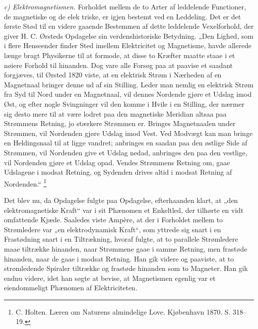 \documentclass[12pt,a4paper]{book}
\newcommand{\runin}[1]{\emph{#1}\hspace{0.4em}}
\begin{document}
\runin{c) Elektromagnetismen.} Forholdet mellem de to Arter af
leddelende Functioner, de magnetiske og de elek\-%
triske, er igjen bestemt ved en Leddeling. Det er det første Stød til
en videre gaaende Bestemmen af dette leddelende Vexelforhold, der
giver H. C. Ørsteds Opdagelse sin verdenshistoriske Betydning.
„Den Lighed, som i flere Henseender finder Sted imellem Elektricitet
og Magnetisme, havde allerede længe bragt Physikerne til at formode,
at disse to Kræfter maatte staae i et nøiere Forhold til hinanden. Dog
vare alle Forsøg paa at paavise et saadant forgjæves, til Ørsted 1820
viste, at en elektrisk Strøm i Nærheden af en Magnetnaal bringer denne
ud af sin Stilling. Leder man nemlig en elektrisk Strøm fra Syd til
Nord under en Magnetnaal, vil dennes Nordende gjøre et Udslag imod
Øst, og efter nogle Svingninger vil den komme i Hvile i en Stilling,
der nærmer sig desto mere til at være lodret paa den magnetiske
Meridian altsaa paa Strømmens Retning, jo stærkere Strømmen er.
Bringes Magnetnaalen under Strømmen, vil Nordenden gjøre Udslag imod
Vest. Ved Modvægt kan man bringe en Heldingsnaal til at ligge vandret;
anbringes en saadan paa den østlige Side af Strømmen, vil Nordenden
give et Udslag nedad, anbringes den paa den vestlige, vil Nordenden
gjøre et Udslag opad. Vendes Strømmens Retning om, gaae Udslagene i
modsat Retning, og Sydenden drives altid i modsat Retning af
Nordenden.“%
\footnote{%
C. Holten. Læren om Naturens almindelige Love. Kjøbenhavn 1870.
S. 318--19.}

Det blev nu, da Opdagelse fulgte paa Opdagelse, efterhaanden klart, at
„den elektromagnetiske Kraft“ var i sit Phænomen et Enkeltled, der
tilhørte en vidt omfattende Kjæde. Saaledes viste Ampère, at der i
Forholdet mellem to Strømledere var „en elektrodynamisk Kraft“, som
yttrede sig snart i en Frastødning snart i en Tiltrækning, hvoraf
fulgte, at to parallele Strømledere maae tiltrække hinanden, naar
Strømmene gaae i samme Retning, men frastøde
hinanden, naar de gaae i modsat Retning. Han gik videre og paaviste,
at to strømledende Spiraler tiltrække og frastøde hinanden som to
Magneter. Han gik endnu videre, idet han søgte at bevise, at
Magnetismen egenlig var et eiendommeligt Phænomen af Elektriciteten.
\end{document}
